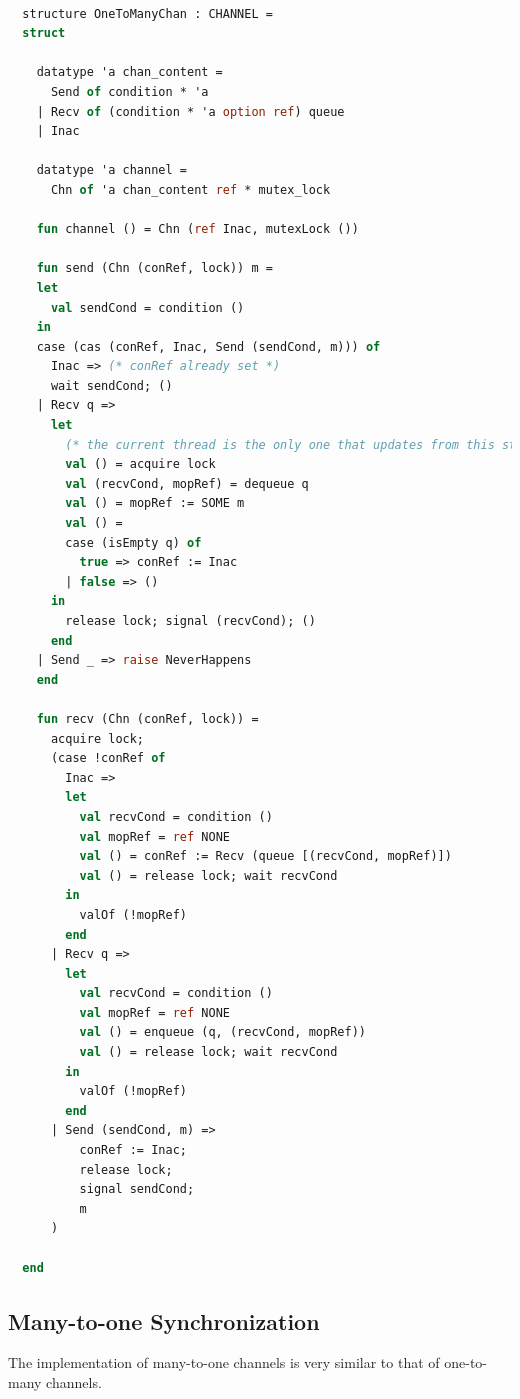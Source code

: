 \documentclass[10pt]{article}
\begin{document}
\begin{lstlisting}[language=ML, mathescape]

  structure OneToManyChan : CHANNEL =
  struct

    datatype 'a chan_content =
      Send of condition * 'a
    | Recv of (condition * 'a option ref) queue
    | Inac

    datatype 'a channel =
      Chn of 'a chan_content ref * mutex_lock

    fun channel () = Chn (ref Inac, mutexLock ())

    fun send (Chn (conRef, lock)) m =
    let
      val sendCond = condition ()
    in
    case (cas (conRef, Inac, Send (sendCond, m))) of
      Inac => (* conRef already set *)
      wait sendCond; ()
    | Recv q =>
      let
        (* the current thread is the only one that updates from this state *)
        val () = acquire lock
        val (recvCond, mopRef) = dequeue q
        val () = mopRef := SOME m
        val () =
        case (isEmpty q) of
          true => conRef := Inac
        | false => ()
      in
        release lock; signal (recvCond); ()
      end
    | Send _ => raise NeverHappens
    end

    fun recv (Chn (conRef, lock)) =
      acquire lock;
      (case !conRef of
        Inac =>
        let
          val recvCond = condition ()
          val mopRef = ref NONE 
          val () = conRef := Recv (queue [(recvCond, mopRef)])
          val () = release lock; wait recvCond
        in
          valOf (!mopRef)
        end
      | Recv q =>
        let
          val recvCond = condition () 
          val mopRef = ref NONE 
          val () = enqueue (q, (recvCond, mopRef))
          val () = release lock; wait recvCond
        in
          valOf (!mopRef)
        end
      | Send (sendCond, m) =>
          conRef := Inac;
          release lock;
          signal sendCond;
          m
      ) 

  end 
\end{lstlisting}

\subsection{Many-to-one Synchronization}

The implementation of many-to-one channels is very similar to that of one-to-many channels.
\end{document}
